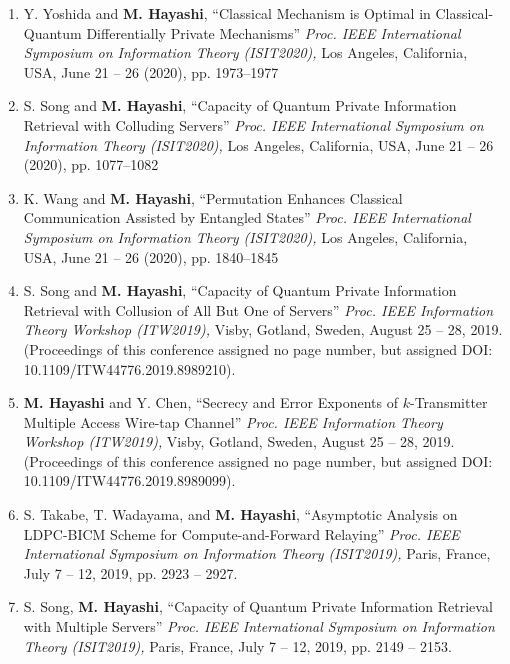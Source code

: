 \documentclass[a4paper,12pt,oneside]{article}
\begin{document}
\begin{enumerate}
    \item
    Y. Yoshida and \textbf{M. Hayashi}, 
    ``Classical Mechanism is Optimal in Classical-Quantum Differentially Private Mechanisms''
    {\em Proc. IEEE International Symposium on Information Theory (ISIT2020),} 
    Los Angeles, California, USA, June 21 -- 26 (2020), pp. 1973--1977
    
    \item
    S. Song and \textbf{M. Hayashi}, 
    ``Capacity of Quantum Private Information Retrieval with Colluding Servers''
    {\em Proc. IEEE International Symposium on Information Theory (ISIT2020),} 
    Los Angeles, California, USA, June 21 -- 26 (2020), pp. 1077--1082
    
    \item
    K. Wang and \textbf{M. Hayashi}, 
    ``Permutation Enhances Classical Communication Assisted by Entangled States''
    {\em Proc. IEEE International Symposium on Information Theory (ISIT2020),} 
    Los Angeles, California, USA, June 21 -- 26 (2020), pp. 1840--1845
    
    \item
    S. Song and \textbf{M. Hayashi}, 
    ``Capacity of Quantum Private Information Retrieval with Collusion of All But One of Servers''
    {\em Proc. IEEE Information Theory Workshop (ITW2019),} 
    Visby, Gotland, Sweden, August 25 -- 28, 2019. 
    (Proceedings of this conference assigned no page number, but assigned DOI: 10.1109/ITW44776.2019.8989210).
    
    \item
    \textbf{M. Hayashi} and Y. Chen,
    ``Secrecy and Error Exponents of $k$-Transmitter Multiple Access Wire-tap Channel''
    {\em Proc. IEEE Information Theory Workshop (ITW2019),} 
    Visby, Gotland, Sweden, August 25 -- 28, 2019. 
    (Proceedings of this conference assigned no page number, but assigned DOI: 10.1109/ITW44776.2019.8989099).
    
    \item
    S. Takabe, T. Wadayama, and \textbf{M. Hayashi}, 
    ``Asymptotic Analysis on LDPC-BICM Scheme for Compute-and-Forward Relaying''
    {\em Proc. IEEE International Symposium on Information Theory (ISIT2019),} 
    Paris, France, July 7 -- 12, 2019, pp. 2923 -- 2927. 
    
    \item
    S. Song, \textbf{M. Hayashi}, 
    ``Capacity of Quantum Private Information Retrieval with Multiple Servers''
    {\em Proc. IEEE International Symposium on Information Theory (ISIT2019),} 
    Paris, France, July 7 -- 12, 2019, pp. 2149 -- 2153. 
    

\end{enumerate}
\end{document}

